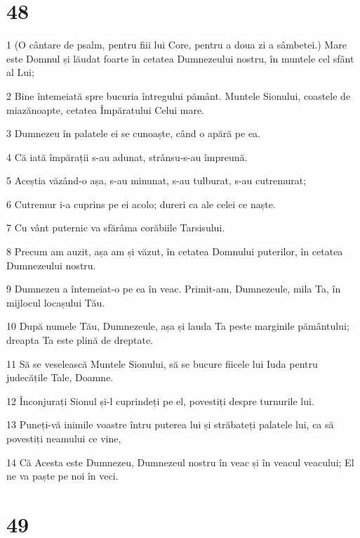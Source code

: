 \chapter{48}

\par 1 (O cântare de psalm, pentru fiii lui Core, pentru a doua zi a sâmbetei.) Mare este Domnul și lăudat foarte în cetatea Dumnezeului nostru, în muntele cel sfânt al Lui;
\par 2 Bine întemeiată spre bucuria întregului pământ. Muntele Sionului, coastele de miazănoapte, cetatea Împăratului Celui mare.
\par 3 Dumnezeu în palatele ei se cunoaște, când o apără pe ea.
\par 4 Că iată împărații s-au adunat, strânsu-s-au împreună.
\par 5 Aceștia văzând-o așa, s-au minunat, s-au tulburat, s-au cutremurat;
\par 6 Cutremur i-a cuprins pe ei acolo; dureri ca ale celei ce naște.
\par 7 Cu vânt puternic va sfărâma corăbiile Tarsisului.
\par 8 Precum am auzit, așa am și văzut, în cetatea Domnului puterilor, în cetatea Dumnezeului nostru.
\par 9 Dumnezeu a întemeiat-o pe ea în veac. Primit-am, Dumnezeule, mila Ta, în mijlocul locașului Tău.
\par 10 După numele Tău, Dumnezeule, așa și lauda Ta peste marginile pământului; dreapta Ta este plină de dreptate.
\par 11 Să se veselească Muntele Sionului, să se bucure fiicele lui Iuda pentru judecățile Tale, Doamne.
\par 12 Înconjurați Sionul și-l cuprindeți pe el, povestiți despre turnurile lui.
\par 13 Puneți-vă inimile voastre întru puterea lui și străbateți palatele lui, ca să povestiți neamului ce vine,
\par 14 Că Acesta este Dumnezeu, Dumnezeul nostru în veac și în veacul veacului; El ne va paște pe noi în veci.

\chapter{49}

